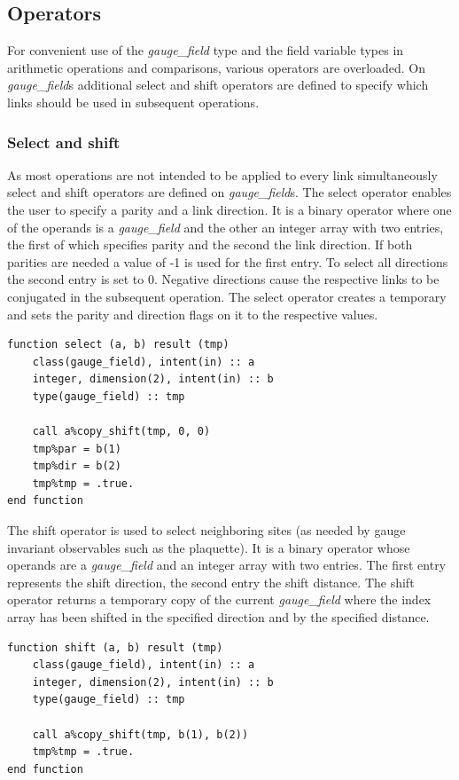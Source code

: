 \documentclass[graybox]{svmult}
\begin{document}
\subsection{Operators}

For convenient use of the \emph{gauge\_field} type and the field variable types in arithmetic operations and comparisons, various operators are overloaded. On \emph{gauge\_field}s additional select and shift operators are defined to specify which links should be used in subsequent operations.

\subsubsection*{Select and shift}

As most operations are not intended to be applied to every link simultaneously select and shift operators are defined on \emph{gauge\_field}s. The select operator enables the user to specify a parity and a link direction. It is a binary operator where one of the operands is a \emph{gauge\_field} and the other an integer array with two entries, the first of which specifies parity and the second the link direction. If both parities are needed a value of -1 is used for the first entry. To select all directions the second entry is set to 0. Negative directions cause the respective links to be conjugated in the subsequent operation. The select operator creates a temporary and sets the parity and direction flags on it to the respective values.
\begin{lstlisting}[caption={Select operator of the \emph{gauge\_field} type}]
function select (a, b) result (tmp)
    class(gauge_field), intent(in) :: a
    integer, dimension(2), intent(in) :: b
    type(gauge_field) :: tmp
        
    call a%copy_shift(tmp, 0, 0)
    tmp%par = b(1)
    tmp%dir = b(2)
    tmp%tmp = .true.
end function
\end{lstlisting}

The shift operator is used to select neighboring sites (as needed by gauge invariant observables such as the plaquette). It is a binary operator whose operands are a \emph{gauge\_field} and an integer array with two entries. The first entry represents the shift direction, the second entry the shift distance. The shift operator returns a temporary copy of the current \emph{gauge\_field} where the index array has been shifted in the specified direction and by the specified distance.
\begin{lstlisting}[caption={Shift operator of the \emph{gauge\_field} type}]
function shift (a, b) result (tmp)
    class(gauge_field), intent(in) :: a
    integer, dimension(2), intent(in) :: b
    type(gauge_field) :: tmp

    call a%copy_shift(tmp, b(1), b(2))
    tmp%tmp = .true.
end function
\end{lstlisting}
\end{document}
